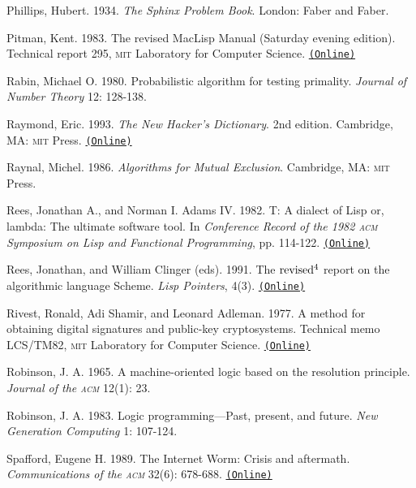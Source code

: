 \documentclass[8pt,oneside]{book}
\newcommand{\acronym}[1]{\textsc{\MakeLowercase{#1}}}
\newcommand{\code}[1]{\texttt{#1}}
\begin{document}
 \label{Phillips 1934}
Phillips, Hubert.  1934. \textit{The Sphinx Problem Book}.  London: Faber and
Faber.

 \label{Pitman 1983}
Pitman, Kent. 1983. The revised MacLisp Manual (Saturday evening edition).
Technical report 295, \acronym{MIT} Laboratory for Computer Science.
\href{http://maclisp.info/pitmanual}{\code{(Online)}}

 \label{Rabin 1980}
Rabin, Michael O. 1980. Probabilistic algorithm for testing primality.
\textit{Journal of Number Theory} 12: 128-138.

 \label{Raymond 1993}
Raymond, Eric.  1993. \textit{The New Hacker's Dictionary}. 2nd edition.
Cambridge, MA: \acronym{MIT} Press.
\href{http://www.outpost9.com/reference/jargon/jargon_toc.html}{\code{(Online)}}

Raynal, Michel. 1986. \textit{Algorithms for Mutual Exclusion}.  Cambridge, MA:
\acronym{MIT} Press.

 \label{Rees and Adams 1982}
Rees, Jonathan A., and Norman I. Adams IV. 1982.  T: A dialect of Lisp or,
lambda: The ultimate software tool.  In \textit{Conference Record of the 1982
\acronym{ACM} Symposium on Lisp and Functional Programming}, pp.  114-122.
\href{http://people.csail.mit.edu/riastradh/t/adams82t.pdf}{\code{(Online)}}

Rees, Jonathan, and William Clinger (eds). 1991.  The \( \rm revised^4 \) report on the
algorithmic language Scheme.  \textit{Lisp Pointers}, 4(3).
\href{http://people.csail.mit.edu/jaffer/r4rs_toc.html}{\code{(Online)}}

 \label{Rivest et al. (1977)}
Rivest, Ronald, Adi Shamir, and Leonard Adleman.  1977.  A method for obtaining
digital signatures and public-key cryptosystems. Technical memo LCS/TM82,
\acronym{MIT} Laboratory for Computer Science.
\href{http://people.csail.mit.edu/rivest/Rsapaper.pdf}{\code{(Online)}}

 \label{Robinson 1965}
Robinson, J. A. 1965.  A machine-oriented logic based on the resolution
principle.  \textit{Journal of the \acronym{ACM}} 12(1): 23.

 \label{Robinson 1983}
Robinson, J. A. 1983.  Logic programming---Past, present, and future.
\textit{New Generation Computing} 1: 107-124.

 \label{Spafford 1989}
Spafford, Eugene H.  1989.  The Internet Worm: Crisis and aftermath.
\textit{Communications of the \acronym{ACM}} 32(6): 678-688.
\href{http://citeseerx.ist.psu.edu/viewdoc/download?doi=10.1.1.123.8503&rep=rep1&type=pdf}{\code{(Online)}}
\end{document}
